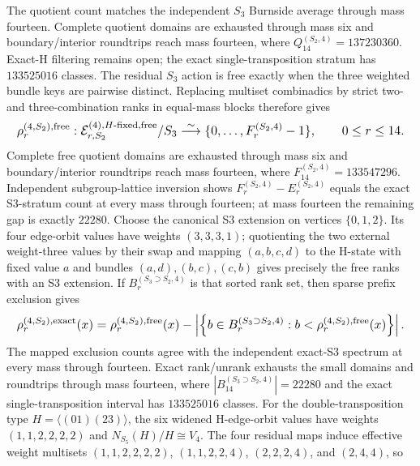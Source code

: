 \documentclass{article}
\newcommand{\fitmath}[1]{\resizebox{0.99\linewidth}{!}{$\displaystyle #1$}}
\begin{document}
The quotient count matches the independent $S_3$ Burnside average through mass
fourteen. Complete quotient domains are exhausted through mass six and
boundary/interior roundtrips reach mass fourteen, where
$Q_{14}^{(S_2,4)}=137230360$. Exact-H filtering remains open; the exact
single-transposition stratum has $133525016$ classes.
The residual $S_3$ action is free exactly when the three weighted bundle keys
are pairwise distinct. Replacing multiset combinadics by strict two- and
three-combination ranks in equal-mass blocks therefore gives
\begin{equation}
  \fitmath{%
    \rho^{(4,S_2),\mathrm{free}}_r:
      \mathcal E_{r,S_2}^{(4),H\text{-fixed,free}}/S_3
      \overset{\sim}{\longrightarrow}
      \{0,\ldots,F_r^{(S_2,4)}-1\},
    \qquad 0\leq r\leq14.
  }
  \label{eq:optimization-crazy-sextuple-s6-s5-transposition-free-ranking}
\end{equation}
Complete free quotient domains are exhausted through mass six and
boundary/interior roundtrips reach mass fourteen, where
$F_{14}^{(S_2,4)}=133547296$. Independent subgroup-lattice inversion shows
$F_r^{(S_2,4)}-E_r^{(S_2,4)}$ equals the exact S3-stratum count at every mass
through fourteen; at mass fourteen the remaining gap is exactly $22280$.
Choose the canonical S3 extension on vertices $\{0,1,2\}$. Its four edge-orbit
values have weights $(3,3,3,1)$; quotienting the two external weight-three
values by their swap and mapping $(a,b,c,d)$ to the H-state with fixed value
$a$ and bundles $(a,d),(b,c),(c,b)$ gives precisely the free ranks with an S3
extension. If $B_r^{(S_3\supset S_2,4)}$ is that sorted rank set, then sparse
prefix exclusion gives
\begin{equation}
  \fitmath{%
    \rho^{(4,S_2),\mathrm{exact}}_r(x)=
      \rho^{(4,S_2),\mathrm{free}}_r(x)
      -\left|\left\{b\in B_r^{(S_3\supset S_2,4)}:
        b<\rho^{(4,S_2),\mathrm{free}}_r(x)\right\}\right|.
  }
  \label{eq:optimization-crazy-sextuple-s6-s5-transposition-exact-ranking}
\end{equation}
The mapped exclusion counts agree with the independent exact-S3 spectrum at
every mass through fourteen. Exact rank/unrank exhausts the small domains and
roundtrips through mass fourteen, where $|B_{14}^{(S_3\supset S_2,4)}|=22280$
and the exact single-transposition interval has $133525016$ classes.
For the double-transposition type $H=\langle(01)(23)\rangle$, the six widened
H-edge-orbit values have weights $(1,1,2,2,2,2)$ and
$N_{S_5}(H)/H\cong V_4$. The four residual maps induce effective weight
multisets $(1,1,2,2,2,2)$, $(1,1,2,2,4)$, $(2,2,2,4)$, and $(2,4,4)$, so
\end{document}

